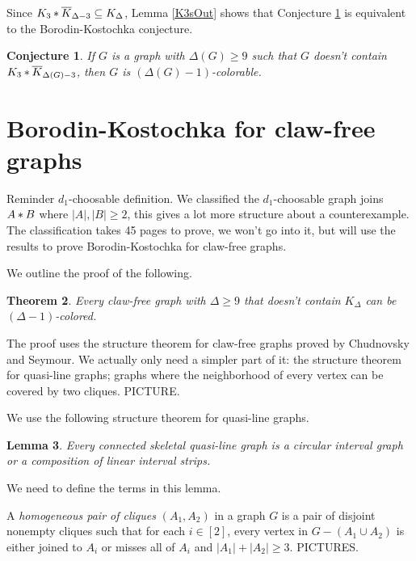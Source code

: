 \documentclass[12pt]{article}
\theoremstyle{plain}
\newtheorem{thm}{Theorem}[section]
\newtheorem{lem}[thm]{Lemma}
\newtheorem{conjecture}[thm]{Conjecture}
\theoremstyle{definition}
\theoremstyle{remark}
\newcommand{\card}[1]{\left|#1\right|}
\newcommand{\irange}[1]{\left[#1\right]}
\newcommand{\join}[2]{#1 \mbox{\hspace{2 pt}$\ast$\hspace{2 pt}} #2}
\begin{document}


Since $\join{K_3}{\overline{K}_{\Delta-3}} \subseteq K_\Delta$, Lemma \ref{K3sOut} shows
that Conjecture \ref{K3Conjecture} is equivalent to the Borodin-Kostochka
conjecture.

\begin{conjecture}\label{K3Conjecture}
If $G$ is a graph with $\Delta(G) \geq 9$ such that $G$ doesn't contain $\join{K_3}{\overline{K}_{\Delta(G)-3}}$, then $G$ is $(\Delta(G)-1)$-colorable.
\end{conjecture}

\section{Borodin-Kostochka for claw-free graphs}
Reminder $d_1$-choosable definition. We classified the $d_1$-choosable graph joins $\join{A}{B}$ where $\card{A}, \card{B} \geq 2$, this gives a lot more structure about a counterexample.  The classification takes 45 pages to prove, we won't go into it, but will use the results to prove Borodin-Kostochka for claw-free graphs.

\bigskip
We outline the proof of the following.
\begin{thm}
Every claw-free graph with $\Delta \geq 9$ that doesn't contain $K_{\Delta}$ can be $(\Delta-1)$-colored.
\end{thm}

The proof uses the structure theorem for claw-free graphs proved by Chudnovsky and Seymour. We actually only need a simpler part of it: the structure theorem for quasi-line graphs; graphs where the neighborhood of every vertex can be covered by two cliques.  PICTURE.

\bigskip

We use the following structure theorem for quasi-line graphs.

\begin{lem}\label{QuasilineStructure}
Every connected skeletal quasi-line graph is a circular interval graph or a composition of
linear interval strips.
\end{lem}

We need to define the terms in this lemma.

A \emph{homogeneous pair of cliques} $(A_1, A_2)$ in a graph $G$ is a pair of
disjoint nonempty cliques such that for each $i \in \irange{2}$, every vertex in
$G - (A_1 \cup A_2)$ is either joined to $A_i$ or misses all of $A_i$ and
$\card{A_1} + \card{A_2} \geq 3$. PICTURES.
\end{document}
